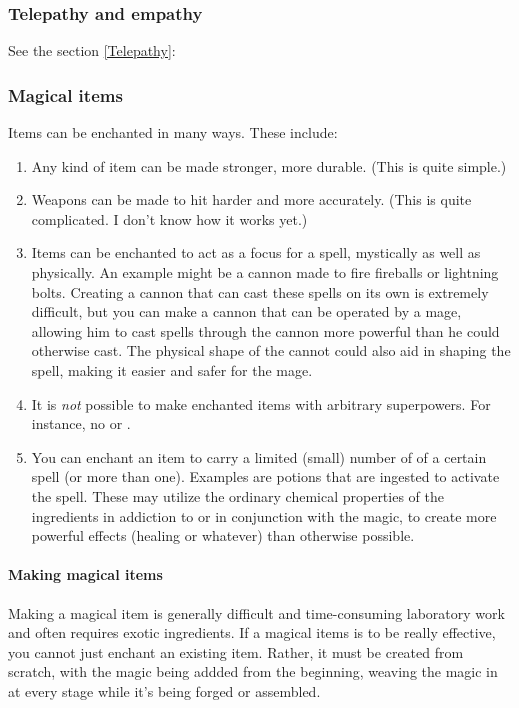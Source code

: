 \subsubsection{Telepathy and empathy}
See the section \ref{Telepathy}: 





\subsubsection{Magical items}
Items can be enchanted in many ways. These include:

\begin{enumerate}
  \item 
    Any kind of item can be made stronger, more durable. (This is quite simple.)
  \item 
    Weapons can be made to hit harder and more accurately. (This is quite complicated. I don't know how it works yet.)
  \item 
    Items can be enchanted to act as a focus for a spell, mystically as well as physically. An example might be a cannon made to fire fireballs or lightning bolts. Creating a cannon that can cast these spells on its own is extremely difficult, but you can make a cannon that can be operated by a mage, allowing him to cast spells through the cannon more powerful than he could otherwise cast. The physical shape of the cannot could also aid in shaping the spell, making it easier and safer for the mage. 
  \item 
    It is \emph{not} possible to make enchanted items with arbitrary superpowers. For instance, no  or .
  \item 
    You can enchant an item to carry a limited (small) number of  of a certain spell (or more than one). Examples are potions that are ingested to activate the spell. These may utilize the ordinary chemical properties of the ingredients in addiction to or in conjunction with the magic, to create more powerful effects (healing or whatever) than otherwise possible. 
\end{enumerate}

\paragraph{Making magical items}
Making a magical item is generally difficult and time-consuming laboratory work and often requires exotic ingredients. If a magical items is to be really effective, you cannot just enchant an existing item. Rather, it must be created from scratch, with the magic being addded from the beginning, weaving the magic in at every stage while it's being forged or assembled. 

